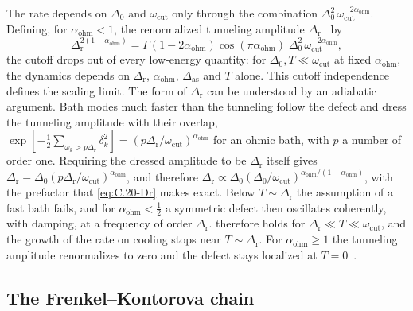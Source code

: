 The rate depends on $\Delta_0$ and $\omega_{\mathrm{cut}}$ only through the combination $\Delta_0^2\,\omega_{\mathrm{cut}}^{-2\alpha_{\mathrm{ohm}}}$. Defining, for $\alpha_{\mathrm{ohm}} < 1$, the renormalized tunneling amplitude $\Delta_{\mathrm{r}}$~\cite{leggett1987dynamics} by
\begin{equation}
  \Delta_{\mathrm{r}}^{2(1 - \alpha_{\mathrm{ohm}})} = \Gamma(1 - 2\alpha_{\mathrm{ohm}})\cos(\pi\alpha_{\mathrm{ohm}})\;\Delta_0^2\,\omega_{\mathrm{cut}}^{-2\alpha_{\mathrm{ohm}}} ,
  \label{eq:C.20-Dr}
\end{equation}
the cutoff drops out of every low-energy quantity: for $\Delta_0, T \ll \omega_{\mathrm{cut}}$ at fixed $\alpha_{\mathrm{ohm}}$, the dynamics depends on $\Delta_{\mathrm{r}}$, $\alpha_{\mathrm{ohm}}$, $\Delta_{\mathrm{as}}$ and $T$ alone. This cutoff independence defines the scaling limit. The form of $\Delta_{\mathrm{r}}$ can be understood by an adiabatic argument. Bath modes much faster than the tunneling follow the defect and dress the tunneling amplitude with their overlap, $\exp[-\tfrac12\sum_{\omega_k > p\Delta_{\mathrm{r}}}\delta_k^2] = (p\Delta_{\mathrm{r}}/\omega_{\mathrm{cut}})^{\alpha_{\mathrm{ohm}}}$ for an ohmic bath, with $p$ a number of order one. Requiring the dressed amplitude to be $\Delta_{\mathrm{r}}$ itself gives $\Delta_{\mathrm{r}} = \Delta_0(p\Delta_{\mathrm{r}}/\omega_{\mathrm{cut}})^{\alpha_{\mathrm{ohm}}}$, and therefore $\Delta_{\mathrm{r}} \propto \Delta_0(\Delta_0/\omega_{\mathrm{cut}})^{\alpha_{\mathrm{ohm}}/(1 - \alpha_{\mathrm{ohm}})}$, with the prefactor that \cref{eq:C.20-Dr} makes exact. Below $T \sim \Delta_{\mathrm{r}}$ the assumption of a fast bath fails, and for $\alpha_{\mathrm{ohm}} < \tfrac12$ a symmetric defect then oscillates coherently, with damping, at a frequency of order $\Delta_{\mathrm{r}}$.  therefore holds for $\Delta_{\mathrm{r}} \ll T \ll \omega_{\mathrm{cut}}$, and the growth of the rate on cooling stops near $T \sim \Delta_{\mathrm{r}}$. For $\alpha_{\mathrm{ohm}} \ge 1$ the tunneling amplitude renormalizes to zero and the defect stays localized at $T = 0$~\cite{leggett1987dynamics}.

\subsection{The Frenkel--Kontorova chain}

